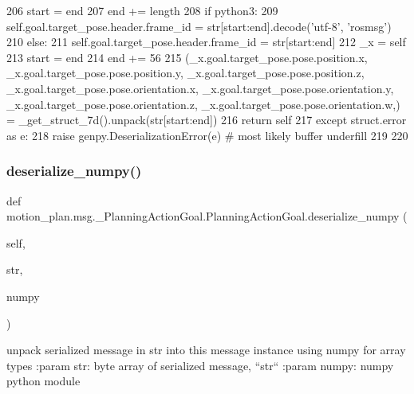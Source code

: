 \begin{DoxyCode}
206       start = end
207       end += length
208       \textcolor{keywordflow}{if} python3:
209         self.goal.target\_pose.header.frame\_id = str[start:end].decode(\textcolor{stringliteral}{'utf-8'}, \textcolor{stringliteral}{'rosmsg'})
210       \textcolor{keywordflow}{else}:
211         self.goal.target\_pose.header.frame\_id = str[start:end]
212       \_x = self
213       start = end
214       end += 56
215       (\_x.goal.target\_pose.pose.position.x, \_x.goal.target\_pose.pose.position.y, 
      \_x.goal.target\_pose.pose.position.z, \_x.goal.target\_pose.pose.orientation.x, \_x.goal.target\_pose.pose.orientation.y, 
      \_x.goal.target\_pose.pose.orientation.z, \_x.goal.target\_pose.pose.orientation.w,) = \_get\_struct\_7d().unpack(str[start:end])
216       \textcolor{keywordflow}{return} self
217     \textcolor{keywordflow}{except} struct.error \textcolor{keyword}{as} e:
218       \textcolor{keywordflow}{raise} genpy.DeserializationError(e)  \textcolor{comment}{# most likely buffer underfill}
219 
220 
\end{DoxyCode}
\mbox{\label{classmotion__plan_1_1msg_1_1__PlanningActionGoal_1_1PlanningActionGoal_acecbcabb434e9a352f339fa8ce6d56cb}} 
\subsubsection{\texorpdfstring{deserialize\+\_\+numpy()}{deserialize\_numpy()}}
{\footnotesize\ttfamily def motion\+\_\+plan.\+msg.\+\_\+\+Planning\+Action\+Goal.\+Planning\+Action\+Goal.\+deserialize\+\_\+numpy (\begin{DoxyParamCaption}\item[{}]{self,  }\item[{}]{str,  }\item[{}]{numpy }\end{DoxyParamCaption})}

\begin{DoxyVerb}unpack serialized message in str into this message instance using numpy for array types
:param str: byte array of serialized message, ``str``
:param numpy: numpy python module
\end{DoxyVerb}
 

